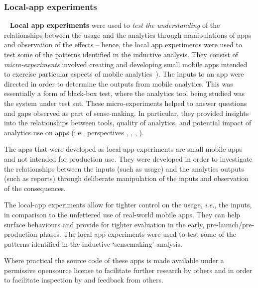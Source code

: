 \subsubsection{Local-app experiments}~\label{local-app-experiments-research-method} 
\textbf{Local app experiments} were used to \textit{test the understanding} of the relationships between the usage and the analytics through manipulations of apps and observation of the effects -- hence, the local app experiments were used to test some of the patterns identified in the inductive analysis. They consist of \textit{micro-experiments} involved creating and developing small mobile apps intended to exercise particular aspects of mobile analytics~). The inputs to an app were directed in order to determine the outputs from mobile analytics. This was essentially a form of black-box test, where the analytics tool being studied was the system under test \acrfull{sut}. These micro-experiments helped to answer questions and gaps observed as part of sense-making.  In particular, they provided insights into the relationships between tools, quality of analytics, and potential impact of analytics use on apps (i.e., perspectives \uartefacts, \utools, \iartefacts, \itools). 

The apps that were developed as local-app experiments are small mobile apps and not intended for production use. They were developed in order to investigate the relationships between the inputs (such as usage) and the analytics outputs (such as reports) through deliberate manipulation of the inputs and observation of the consequences.  

The local-app experiments allow for tighter control on the usage, \textit{i.e.}, the inputs, in comparison to the unfettered use of real-world mobile apps. They can help surface behaviours and provide for tighter evaluation in the early, pre-launch/pre-production phases. %
The local app experiments were used to test some of the patterns identified in the inductive `sensemaking' analysis.

Where practical the source code of these apps is made available under a permissive opensource license to facilitate further research by others and in order to facilitate inspection by and feedback from others.

